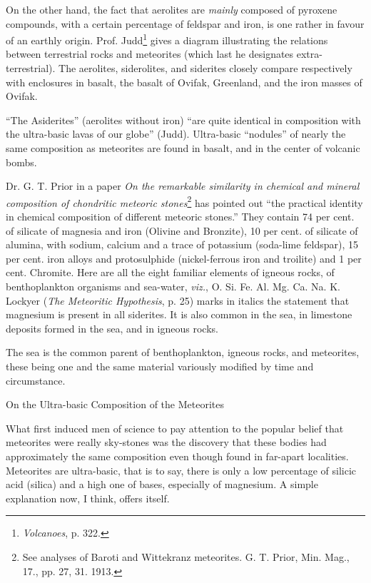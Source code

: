 \documentclass[a4paper, 12pt, oneside]{article}
\begin{document}
On the other hand, the fact that aerolites are \emph{mainly} composed of pyroxene compounds, with a certain percentage of feldspar and iron, is one rather in favour of an earthly origin. Prof. Judd\footnote{\emph{Volcanoes}, p. 322.} gives a diagram illustrating the relations between terrestrial rocks and meteorites (which last he designates extra-terrestrial). The aerolites, siderolites, and siderites closely compare respectively with enclosures in basalt, the basalt of Ovifak, Greenland, and the iron masses of Ovifak.

``The Asiderites'' (aerolites without iron) ``are quite identical in composition with the ultra-basic lavas of our globe'' (Judd). Ultra-basic ``nodules'' of nearly the same composition as meteorites are found in basalt, and in the center of volcanic bombs.

Dr. G. T. Prior in a paper \emph{On the remarkable similarity in chemical and mineral composition of chondritic meteoric stones}\footnote{See analyses of Baroti and Wittekranz meteorites. G. T. Prior, Min. Mag., 17., pp. 27, 31. 1913.} has pointed out ``the practical identity in chemical composition of different meteoric stones.'' They contain 74 per cent. of silicate of magnesia and iron (Olivine and Bronzite), 10 per cent. of silicate of alumina, with sodium, calcium and a trace of potassium (soda-lime feldspar), 15 per cent. iron alloys and protosulphide (nickel-ferrous iron and troilite) and 1 per cent. Chromite. Here are all the eight familiar elements of igneous rocks, of benthoplankton organisms and sea-water, \emph{viz.}, O. Si. Fe. Al. Mg. Ca. Na. K. Lockyer (\emph{The Meteoritic Hypothesis}, p. 25) marks in italics the statement that magnesium is present in all siderites. It is also common in the sea, in limestone deposits formed in the sea, and in igneous rocks.

The sea is the common parent of benthoplankton, igneous rocks, and meteorites, these being one and the same material variously modified by time and circumstance.

On the Ultra-basic Composition of the Meteorites

What first induced men of science to pay attention to the popular belief that meteorites were really sky-stones was the discovery that these bodies had approximately the same composition even though found in far-apart localities. Meteorites are ultra-basic, that is to say, there is only a low percentage of silicic acid (silica) and a high one of bases, especially of magnesium. A simple explanation now, I think, offers itself.
\end{document}

